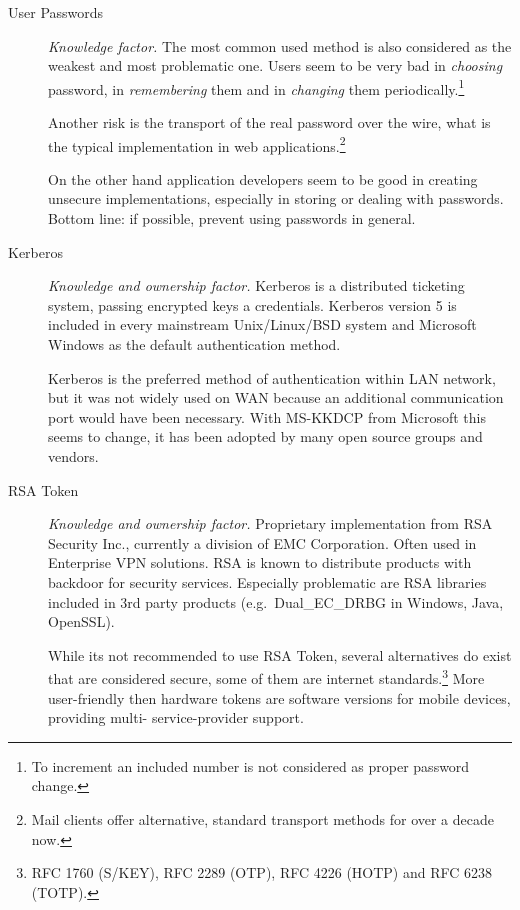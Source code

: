 \documentclass[11pt]{report}
\begin{document}
\begin{description}

    \item[User Passwords] \emph{Knowledge factor.}  The most common used
        method is also considered as the weakest and most problematic
        one.  Users seem to be very bad in \emph{choosing} password, in
        \emph{remembering} them and in \emph{changing} them
        periodically.\footnote{To increment an included number is not
        considered as proper password change.}
            
        Another risk is the transport of the real password over the
        wire, what is the typical implementation in web
        applications.\footnote{Mail clients offer alternative, standard
        transport methods for over a decade now.}
        
        On the other hand application developers seem to be good in
        creating unsecure implementations, especially in storing or
        dealing with passwords. Bottom line: if possible, prevent using
        passwords in general.
    
    \item[Kerberos] \emph{Knowledge and ownership factor.}  Kerberos is
        a distributed ticketing system, passing encrypted keys a
        credentials. Kerberos version 5 is included in every mainstream
        Unix/Linux/BSD system and Microsoft Windows as the default
        authentication method.
        
        Kerberos is the preferred method of authentication within LAN
        network, but it was not widely used on WAN because an additional
        communication port would have been necessary. With MS-KKDCP from
        Microsoft this seems to change, it has been adopted by many open
        source groups and vendors.
        
    \item[RSA Token] \emph{Knowledge and ownership factor.}  Proprietary
        implementation from RSA Security Inc., currently a division of
        EMC Corporation. Often used in Enterprise VPN solutions. RSA is
        known to distribute products with backdoor for security
        services.  Especially problematic are RSA libraries included in
        3rd party products (e.g.\ Dual\_EC\_DRBG in Windows, Java,
        OpenSSL).

        While its not recommended to use RSA Token, several alternatives
        do exist that are considered secure, some of them are internet
        standards.\footnote{RFC 1760 (S/KEY), RFC 2289 (OTP), RFC 4226
        (HOTP) and RFC 6238 (TOTP).} More user-friendly then hardware
        tokens are software versions for mobile devices, providing multi-
        service-provider support.


\end{description}
\end{document}
